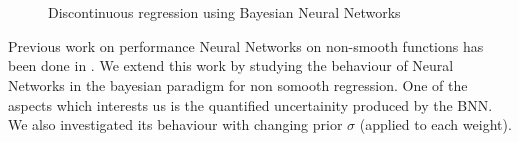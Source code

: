 \documentclass[a4paper, twocolumn]{article}
\begin{document}
\begin{figure}[!h]
    \hfill
    \hfill
    \hfill
    \hfill
    \\
    \\
    \caption{Discontinuous regression using Bayesian Neural Networks}
\end{figure}


Previous work on performance Neural Networks on non-smooth functions has been done in \cite{NNnonsmooth}. We extend this work by studying the behaviour of Neural Networks in the bayesian paradigm for non somooth regression. One of the aspects which interests us is the quantified uncertainity produced by the BNN. We also investigated its behaviour with changing prior $\sigma$ (applied to each weight). 
\end{document}
